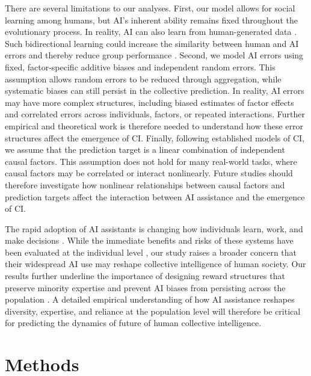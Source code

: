 \documentclass[12pt]{article}
\begin{document}
There are several limitations to our analyses.
First, our model allows for social learning among humans, but AI's inherent ability remains fixed throughout the evolutionary process.
In reality, AI can also learn from human-generated data \citep{ouyang2022training}.
Such bidirectional learning could increase the similarity between human and AI errors and thereby reduce group performance \citep{glickman2025human}.
Second, we model AI errors using fixed, factor-specific additive biases and independent random errors.
This assumption allows random errors to be reduced through aggregation, while systematic biases can still persist in the collective prediction.
In reality, AI errors may have more complex structures, including biased estimates of factor effects and correlated errors across individuals, factors, or repeated interactions.
Further empirical and theoretical work is therefore needed to understand how these error structures affect the emergence of CI.
Finally, following established models of CI, we assume that the prediction target is a linear combination of independent causal factors.
This assumption does not hold for many real-world tasks, where causal factors may be correlated or interact nonlinearly.
Future studies should therefore investigate how nonlinear relationships between causal factors and prediction targets affect the interaction between AI assistance and the emergence of CI.

The rapid adoption of AI assistants is changing how individuals learn, work, and make decisions \citep{tessler2024ai,glickman2025human,sajadieh2026artificial,bick2026rapid,ke2026ai}.
While the immediate benefits and risks of these systems have been evaluated at the individual level \citep{noy2023experimental,bastani2025generative}, our study raises a broader concern that their widespread AI use may reshape collective intelligence of human society.
Our results further underline the importance of designing reward structures that preserve minority expertise and prevent AI biases from persisting across the population \citep{mann2017optimal,vicente2023humans,glickman2025human,wang2025individual}.
A detailed empirical understanding of how AI assistance reshapes diversity, expertise, and reliance at the population level will therefore be critical for predicting the dynamics of future of human collective intelligence.

\section*{Methods}
\end{document}
